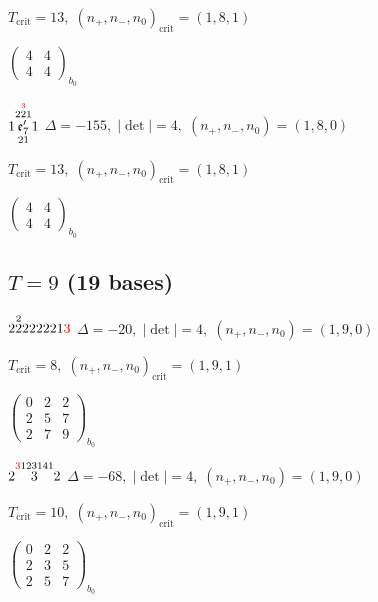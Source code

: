 \documentclass[10pt]{article}
\begin{document}
\hspace{1em}$T_{\text{crit}}=13,\; (n_+,n_-,n_0)_{\text{crit}}=(1,8,1)$

\hspace{2em}$\left(\begin{smallmatrix}4 & 4 \\ 4 & 4\end{smallmatrix}\right)_{\!b_0}$

\smallskip

$1\overset{2\overset{\textcolor{red}{3}}{2}1}{\underset{21}{\mathfrak{e}_7'}}1$ \quad $\Delta=-155,\; |\det|=4,\; (n_+,n_-,n_0)=(1,8,0)$

\hspace{1em}$T_{\text{crit}}=13,\; (n_+,n_-,n_0)_{\text{crit}}=(1,8,1)$

\hspace{2em}$\left(\begin{smallmatrix}4 & 4 \\ 4 & 4\end{smallmatrix}\right)_{\!b_0}$


\subsection*{$T = 9$ \quad (19 bases)}
\smallskip

$2\overset{2}{2}222221\textcolor{red}{3}$ \quad $\Delta=-20,\; |\det|=4,\; (n_+,n_-,n_0)=(1,9,0)$

\hspace{1em}$T_{\text{crit}}=8,\; (n_+,n_-,n_0)_{\text{crit}}=(1,9,1)$

\hspace{2em}$\left(\begin{smallmatrix}0 & 2 & 2 \\ 2 & 5 & 7 \\ 2 & 7 & 9\end{smallmatrix}\right)_{\!b_0}$

\smallskip

$2\overset{\textcolor{red}{3}123141}{3}2$ \quad $\Delta=-68,\; |\det|=4,\; (n_+,n_-,n_0)=(1,9,0)$

\hspace{1em}$T_{\text{crit}}=10,\; (n_+,n_-,n_0)_{\text{crit}}=(1,9,1)$

\hspace{2em}$\left(\begin{smallmatrix}0 & 2 & 2 \\ 2 & 3 & 5 \\ 2 & 5 & 7\end{smallmatrix}\right)_{\!b_0}$
\end{document}
